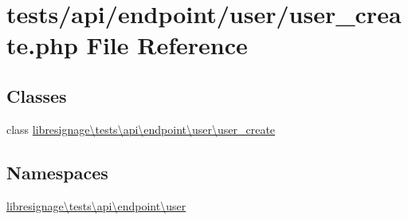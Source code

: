 \hypertarget{tests_2api_2endpoint_2user_2user__create_8php}{}\section{tests/api/endpoint/user/user\+\_\+create.php File Reference}
\label{tests_2api_2endpoint_2user_2user__create_8php}
\subsection*{Classes}
\begin{DoxyCompactItemize}
\item 
class \hyperlink{classlibresignage_1_1tests_1_1api_1_1endpoint_1_1user_1_1user__create}{libresignage\textbackslash{}tests\textbackslash{}api\textbackslash{}endpoint\textbackslash{}user\textbackslash{}user\+\_\+create}
\end{DoxyCompactItemize}
\subsection*{Namespaces}
\begin{DoxyCompactItemize}
\item 
 \hyperlink{namespacelibresignage_1_1tests_1_1api_1_1endpoint_1_1user}{libresignage\textbackslash{}tests\textbackslash{}api\textbackslash{}endpoint\textbackslash{}user}
\end{DoxyCompactItemize}
